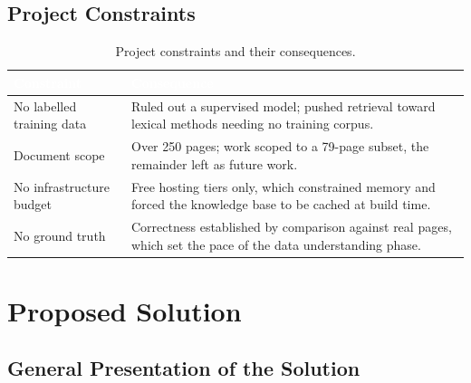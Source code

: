 \subsection{Project Constraints}


\begin{table}[h]
\centering
\caption{Project constraints and their consequences.}
\label{tab:constraints}
\begin{tabular}{|p{}|p{}|}
\hline
\rowcolor{myblue}\textcolor{white}{\textbf{Constraint}} & \textcolor{white}{\textbf{Consequence}} \\
\hline
No labelled training data & Ruled out a supervised model; pushed retrieval toward lexical methods needing no training corpus. \\ \hline
Document scope & Over 250 pages; work scoped to a 79-page subset, the remainder left as future work. \\ \hline
No infrastructure budget & Free hosting tiers only, which constrained memory and forced the knowledge base to be cached at build time. \\ \hline
No ground truth & Correctness established by comparison against real pages, which set the pace of the data understanding phase. \\ \hline
\end{tabular}
\end{table}

\section{Proposed Solution}


\subsection{General Presentation of the Solution}


